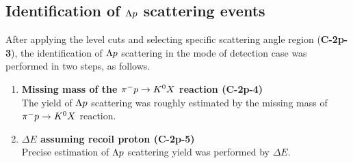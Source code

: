 \begin{comment}
\begin{figure}[!h]
  \begin{minipage}[t]{0.48\columnwidth}
    \centering
    \texttt{[image: dE\_2p\_woPi\_bgsub.png]}
    \caption{$\Delta E$ of the events on $\Lambda$ region of the missing mass before the subtraction with estimated background structure. The green solid line represents the events on the $\Lambda$ region of the missing mass, and the gray shade does the estimated background structure (i.e. $N_{\Delta E\ bg,\ est}$). \textcolor{red}{予想BGはエラーバー付きで描く}}
    \label{fig-dE_2p_woPi_bgsub}
  \end{minipage}
  \hspace{0.04\columnwidth} %
  \begin{minipage}[t]{0.48\columnwidth}
    \centering
    \texttt{[image: dE\_2p\_woPi\_cor.png]}
    \caption{$\Delta E$ on the $\Lambda$ range of the missing mass, which was corrected by the background subtraction (i.e. &N_{\Delta E\ \Lambda,\ cor}$). \textcolor{red}{補正されたΔEはエラーバー付きで描く}}
    \label{fig-dE_2p_woPi_cor}
  \end{minipage}
\end{figure}
\end{comment}




\clearpage
\subsection{Identification of $\Lambda p$ scattering events}
\label{sec-2p_wo_id}

After applying the  level cuts and selecting specific scattering angle region ({\bf C-2p-3}), the identification of $\Lambda p$ scattering in the  mode of detection case  was performed in two steps, as follows. 

\begin{enumerate}
  \item {\bf Missing mass of the $\pi^- p \to K^0 X$ reaction ({\bf C-2p-4}) } \\
  The yield of $\Lambda p$ scattering was roughly estimated by the missing mass of $\pi^- p \to K^0 X$ reaction.
  \item {\bf $\Delta E$ assuming recoil proton ({\bf C-2p-5}) } \\
  Precise estimation of $\Lambda p$ scattering yield was performed by $\Delta E$.
\end{enumerate}

